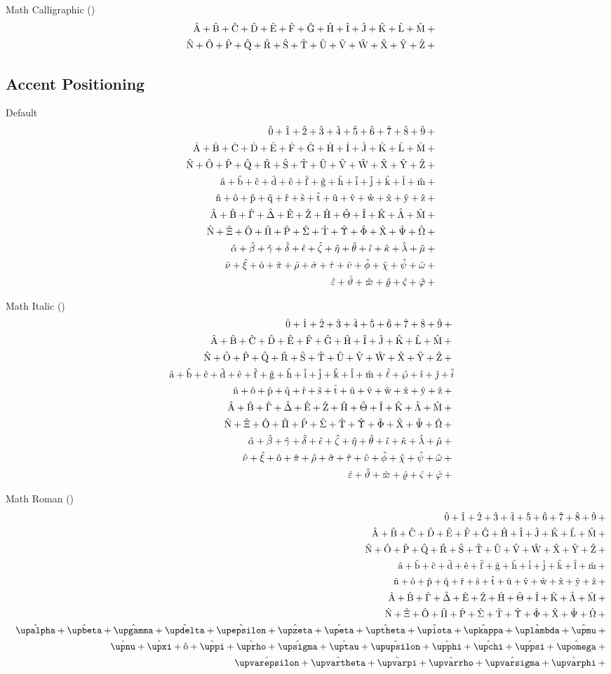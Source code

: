 	Math Calligraphic (\texttt{\string\mathcal})
	\def\test#1{\mathcal{#1}_{i}+{}}%
	\begin{eqnarray*}
	  && {\testupperi}\\
	  && {\testupperii}
	\end{eqnarray*}%

	\subsection{Accent Positioning \showfamily}

	Default
	\def\test#1{\hat{#1}+{}}%
	\begin{eqnarray*}
	  && {\testnums}\\
	  && {\testupperi}\\
	  && {\testupperii}\\
	  && {\testloweri}\\
	  && {\testlowerii}\\
	  && {\testupgreeki}\\
	  && {\testupgreekii}\\
	  && {\testlowgreeki}\\
	  && {\testlowgreekii}\\
	  && {\testlowgreekiii}
	\end{eqnarray*}%

	Math Italic (\texttt{\string\mathit})
	\def\test#1{\hat{\mathit{#1}}+{}}%
	\begin{eqnarray*}
	  && {\testnums}\\
	  && {\testupperi}\\
	  && {\testupperii}\\
	  && {\testloweri} \test\ell \test\wp \test\imath \test\jmath \tilde{i} \\
	  && {\testlowerii}\\
	  && {\testupgreeki}\\
	  && {\testupgreekii}\\
	  && {\testlowgreeki}\\
	  && {\testlowgreekii}\\
	  && {\testlowgreekiii}
	\end{eqnarray*}%

	Math Roman (\texttt{\string\mathrm})
	\def\test#1{\hat{\mathrm{#1}}+{}}%
	\begin{eqnarray*}
	  && {\testnums}\\
	  && {\testupperi}\\
	  && {\testupperii}\\
	  && {\testloweri}\\
	  && {\testlowerii}\\
	  && {\testupgreeki}\\
	  && {\testupgreekii}\\
	  && {\testlowgreekupi}\\
	  && {\testlowgreekupii}\\
	  && {\testlowgreekupiii}
	\end{eqnarray*}%

